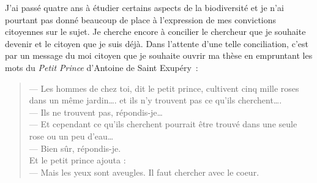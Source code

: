 J'ai passé quatre ans à étudier certains aspects de la biodiversité et
je n'ai pourtant pas donné beaucoup de place à l'expression de mes
convictions citoyennes sur le sujet. Je cherche encore à concilier le
chercheur que je souhaite devenir et le citoyen que je suis déjà. Dans
l'attente d'une telle conciliation, c'est par un message du moi citoyen
que je souhaite ouvrir ma thèse en empruntant les mots du
\textit{Petit Prince} d'Antoine de Saint Exupéry~:

\begin{quote}
--- Les hommes de chez toi, dit le petit prince, cultivent cinq mille
roses dans un même jardin\ldots{}. et ils n'y trouvent pas ce qu'ils
cherchent\ldots{}.\\
--- Ils ne trouvent pas, répondis-je\ldots{}\\
--- Et cependant ce qu'ils cherchent pourrait être trouvé dans une seule
rose ou un peu d'eau\ldots{}\\
--- Bien sûr, répondis-je.\\
Et le petit prince ajouta :\\
--- Mais les yeux sont aveugles. Il faut chercher avec le coeur.
\end{quote}

